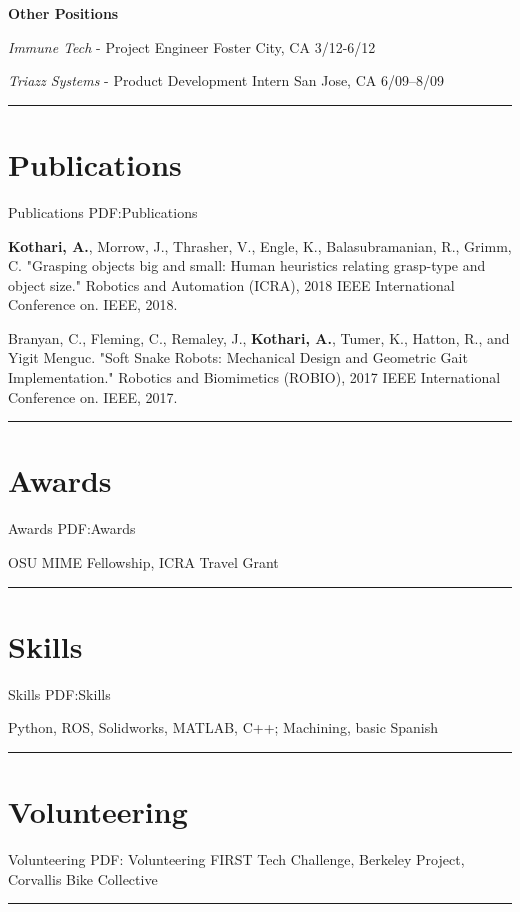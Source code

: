 \documentclass[letterpaper,10pt,oneside]{article}
\newcommand{\BreakLine}{
    \hspace*{-3.2cm}
    \noindent\rule{0.98\textwidth}{0.4pt}
}
\begin{document}
\begin{body}
\begin{detail}
\end{detail}

\BigGap
\textbf{Other Positions}

\textit{Immune Tech} - Project Engineer	\hfill Foster City, CA  3/12-6/12

\textit{Triazz Systems} - Product Development Intern \hfill	 San Jose, CA 	       6/09–8/09

\BreakLine
\section
{Publications}
{Publications}
{PDF:Publications}

\small{\textbf{Kothari, A.}, Morrow, J., Thrasher, V., Engle, K., Balasubramanian, R., Grimm, C. "Grasping objects big and small: Human heuristics relating grasp-type and object size." Robotics and Automation (ICRA), 2018 IEEE International Conference on. IEEE, 2018.

Branyan, C., Fleming, C., Remaley, J., \textbf{Kothari, A.}, Tumer, K., Hatton, R., and Yigit Menguc. "Soft Snake Robots: Mechanical Design and Geometric Gait Implementation." Robotics and Biomimetics (ROBIO), 2017 IEEE International Conference on. IEEE, 2017.
}

\BreakLine
\section
{Awards}
{Awards}
{PDF:Awards}

OSU MIME Fellowship, ICRA Travel Grant

\BreakLine
\section
{Skills}
{Skills}
{PDF:Skills}

Python, ROS, Solidworks, MATLAB, C++; Machining, basic Spanish

\BreakLine
\section
{Volunteering}
{Volunteering}
{PDF: Volunteering}
FIRST Tech Challenge, Berkeley Project, Corvallis Bike Collective

\BreakLine


\end{body}
\end{document}
